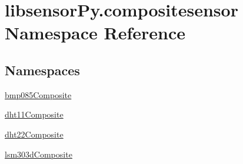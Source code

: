 \hypertarget{namespacelibsensorPy_1_1compositesensor}{}\section{libsensor\+Py.\+compositesensor Namespace Reference}
\label{namespacelibsensorPy_1_1compositesensor}
\subsection*{Namespaces}
\begin{DoxyCompactItemize}
\item 
 \hyperlink{namespacelibsensorPy_1_1compositesensor_1_1bmp085Composite}{bmp085\+Composite}
\item 
 \hyperlink{namespacelibsensorPy_1_1compositesensor_1_1dht11Composite}{dht11\+Composite}
\item 
 \hyperlink{namespacelibsensorPy_1_1compositesensor_1_1dht22Composite}{dht22\+Composite}
\item 
 \hyperlink{namespacelibsensorPy_1_1compositesensor_1_1lsm303dComposite}{lsm303d\+Composite}
\end{DoxyCompactItemize}
